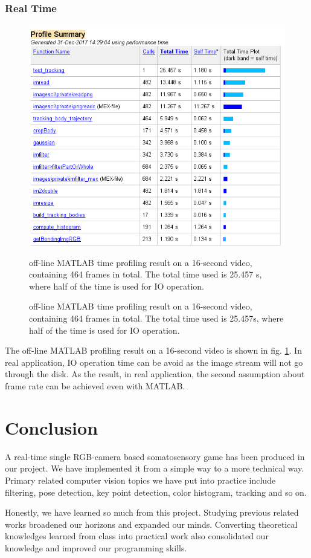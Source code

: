 \documentclass[11pt,twocolumn,letterpaper]{article}
\begin{document}
\subsubsection{Real Time}
\par
\begin{figure}[h]
      \centering
      \includegraphics[width=0.8\linewidth]{./Pic/time.png}

      \caption{off-line MATLAB time profiling result on a 16-second video, containing 464 frames in total. The total time used is 25.457 s, where half of the time is used for IO operation.}

      \caption{off-line MATLAB time profiling result on a 16-second video, containing 464 frames in total. The total time used is 25.457s, where half of the time is used for IO operation.}

\label{timing}      
\end{figure}
 The off-line MATLAB profiling result on a 16-second video is shown in fig. \ref{timing}.  In real application, IO operation time can be avoid as the image stream will not go through the disk. As the result, in real application, the second assumption about frame rate can be achieved even with MATLAB.
\section{Conclusion}

    \par A real-time single RGB-camera based somatosensory game has been produced in our project. We have implemented it from a simple way to a more technical way. Primary related computer vision topics we have put into practice include filtering, pose detection, key point detection, color histogram, tracking and so on.
    \par Honestly, we have learned so much from this project. Studying previous related works broadened our horizons and expanded our minds. Converting theoretical knowledges learned from class into practical work also consolidated our knowledge and improved our programming skills.
\end{document}
